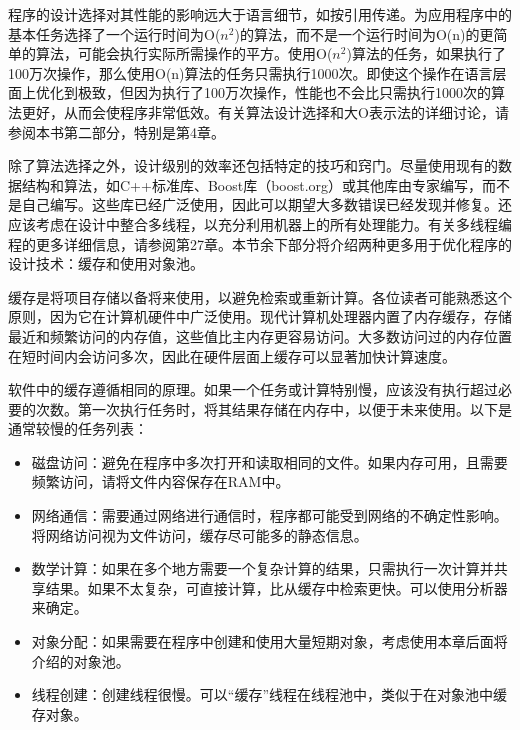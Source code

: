 
程序的设计选择对其性能的影响远大于语言细节，如按引用传递。为应用程序中的基本任务选择了一个运行时间为O($n^2$)的算法，而不是一个运行时间为O(n)的更简单的算法，可能会执行实际所需操作的平方。使用O($n^2$)算法的任务，如果执行了100万次操作，那么使用O(n)算法的任务只需执行1000次。即使这个操作在语言层面上优化到极致，但因为执行了100万次操作，性能也不会比只需执行1000次的算法更好，从而会使程序非常低效。有关算法设计选择和大O表示法的详细讨论，请参阅本书第二部分，特别是第4章。

除了算法选择之外，设计级别的效率还包括特定的技巧和窍门。尽量使用现有的数据结构和算法，如C++标准库、Boost库（boost.org）或其他库由专家编写，而不是自己编写。这些库已经广泛使用，因此可以期望大多数错误已经发现并修复。还应该考虑在设计中整合多线程，以充分利用机器上的所有处理能力。有关多线程编程的更多详细信息，请参阅第27章。本节余下部分将介绍两种更多用于优化程序的设计技术：缓存和使用对象池。


缓存是将项目存储以备将来使用，以避免检索或重新计算。各位读者可能熟悉这个原则，因为它在计算机硬件中广泛使用。现代计算机处理器内置了内存缓存，存储最近和频繁访问的内存值，这些值比主内存更容易访问。大多数访问过的内存位置在短时间内会访问多次，因此在硬件层面上缓存可以显著加快计算速度。

软件中的缓存遵循相同的原理。如果一个任务或计算特别慢，应该没有执行超过必要的次数。第一次执行任务时，将其结果存储在内存中，以便于未来使用。以下是通常较慢的任务列表：

\begin{itemize}
\item
磁盘访问：避免在程序中多次打开和读取相同的文件。如果内存可用，且需要频繁访问，请将文件内容保存在RAM中。

\item
网络通信：需要通过网络进行通信时，程序都可能受到网络的不确定性影响。将网络访问视为文件访问，缓存尽可能多的静态信息。

\item
数学计算：如果在多个地方需要一个复杂计算的结果，只需执行一次计算并共享结果。如果不太复杂，可直接计算，比从缓存中检索更快。可以使用分析器来确定。

\item
对象分配：如果需要在程序中创建和使用大量短期对象，考虑使用本章后面将介绍的对象池。

\item
线程创建：创建线程很慢。可以“缓存”线程在线程池中，类似于在对象池中缓存对象。
\end{itemize}

